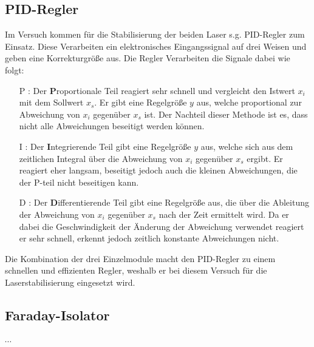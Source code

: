 \documentclass[twoside,colorback,accentcolor=tud4c,11pt]{tudreport}
\begin{document}
\subsection{PID-Regler}
Im Versuch kommen für die Stabilisierung der beiden Laser s.g. PID-Regler zum Einsatz. Diese Verarbeiten ein elektronisches Eingangssignal auf drei Weisen und geben eine Korrekturgröße aus. Die Regler Verarbeiten die Signale dabei wie folgt:
\begin{itemize}
\item[P]: Der $\textbf{P}$roportionale Teil reagiert sehr schnell und vergleicht den Istwert $x_i$ mit dem Sollwert $x_s$. Er gibt eine Regelgröße $y$ aus, welche proportional zur Abweichung von $x_i$ gegenüber $x_s$ ist. Der Nachteil dieser Methode ist es, dass nicht alle Abweichungen beseitigt werden können.
\item[I]: Der $\textbf{I}$ntegrierende Teil gibt eine Regelgröße $y$ aus, welche sich aus dem zeitlichen Integral über die Abweichung von $x_i$ gegenüber $x_s$ ergibt. Er reagiert eher langsam, beseitigt jedoch auch die kleinen Abweichungen, die der P-teil nicht beseitigen kann.
\item[D]: Der $\textbf{D}$ifferentierende Teil gibt eine Regelgröße aus, die über die Ableitung der Abweichung von $x_i$ gegenüber $x_s$ nach der Zeit ermittelt wird. Da er dabei die Geschwindigkeit der Änderung der Abweichung verwendet reagiert er sehr schnell, erkennt jedoch zeitlich konstante Abweichungen nicht.
\end{itemize}
Die Kombination der drei Einzelmodule macht den PID-Regler zu einem schnellen und effizienten Regler, weshalb er bei diesem Versuch für die Laserstabilisierung eingesetzt wird.
\subsection{Faraday-Isolator}
$\cdots$
\end{document}
